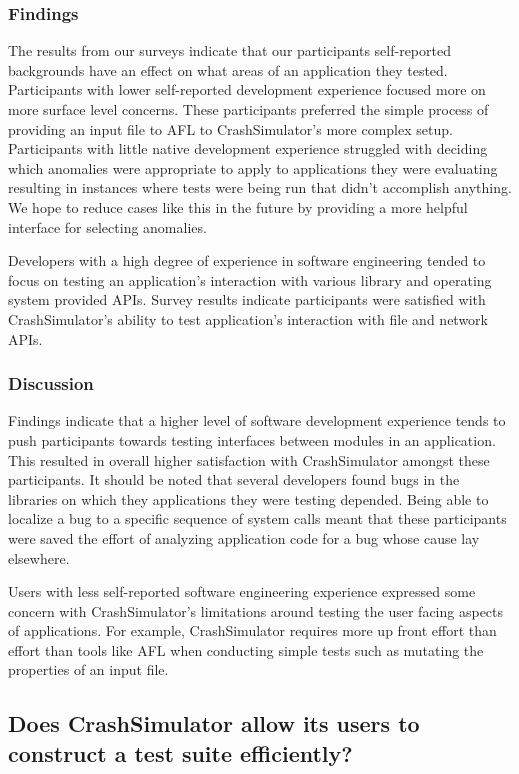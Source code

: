 \subsubsection{Findings}

The results from our surveys indicate that our participants self-reported
backgrounds have an effect on what areas of an application they tested.
Participants with lower self-reported development experience focused more
on more surface level concerns.  These participants preferred the simple
process of providing an input file to AFL to CrashSimulator's more complex
setup.  Participants with little native development experience struggled
with deciding which anomalies were appropriate to apply to applications
they were evaluating resulting in instances where tests were being run that
didn't accomplish anything.  We hope to reduce cases like this in the
future by providing a more helpful interface for selecting anomalies.

Developers with a high degree of experience in software engineering tended
to focus on testing an application's interaction with various library and
operating system provided APIs.  Survey results indicate participants were
satisfied with CrashSimulator's ability to test application's interaction
with file and network APIs.


\subsubsection{Discussion}

Findings indicate that a higher level of software development experience
tends to push participants towards testing interfaces between modules in an
application.  This resulted in overall higher satisfaction with
CrashSimulator amongst these participants.  It should be noted that several
developers found bugs in the libraries on which they applications they were
testing depended.  Being able to localize a bug to a specific sequence of
system calls meant that these participants were saved the effort of
analyzing application code for a bug whose cause lay elsewhere.

Users with less self-reported software engineering experience expressed
some concern with CrashSimulator's limitations around testing the user
facing aspects of applications.  For example, CrashSimulator requires more
up front effort than effort than tools like AFL when conducting simple
tests such as mutating the properties of an input file.


\subsection{Does CrashSimulator allow its users to construct a test suite
efficiently?}

